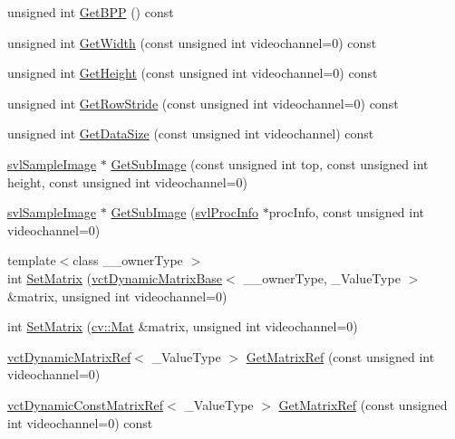 \begin{DoxyCompactItemize}
\item 
unsigned int \hyperlink{classsvl_sample_image_custom_a86dacd22703fbe2f2ac527995c90b704}{Get\+B\+P\+P} () const 
\item 
unsigned int \hyperlink{classsvl_sample_image_custom_af03ade3f099c87b685ad52c0183deac8}{Get\+Width} (const unsigned int videochannel=0) const 
\item 
unsigned int \hyperlink{classsvl_sample_image_custom_aa65d95dad39f90d1f84a9dd978120d95}{Get\+Height} (const unsigned int videochannel=0) const 
\item 
unsigned int \hyperlink{classsvl_sample_image_custom_a82aa2aea1a4d809685cf3c50d7eaaed3}{Get\+Row\+Stride} (const unsigned int videochannel=0) const 
\item 
unsigned int \hyperlink{classsvl_sample_image_custom_a09cde03b41e68144c2d11ce705914fcb}{Get\+Data\+Size} (const unsigned int videochannel) const 
\item 
\hyperlink{classsvl_sample_image}{svl\+Sample\+Image} $\ast$ \hyperlink{classsvl_sample_image_custom_a557f36a16a924eb9fcdd7231a61fb63e}{Get\+Sub\+Image} (const unsigned int top, const unsigned int height, const unsigned int videochannel=0)
\item 
\hyperlink{classsvl_sample_image}{svl\+Sample\+Image} $\ast$ \hyperlink{classsvl_sample_image_custom_af1641340334bb3ab547f17beb3f04383}{Get\+Sub\+Image} (\hyperlink{structsvl_proc_info}{svl\+Proc\+Info} $\ast$proc\+Info, const unsigned int videochannel=0)
\item 
{\footnotesize template$<$class \+\_\+\+\_\+owner\+Type $>$ }\\int \hyperlink{classsvl_sample_image_custom_aea63e2d0635a36a2123e4680d9ff78b2}{Set\+Matrix} (\hyperlink{classvct_dynamic_matrix_base}{vct\+Dynamic\+Matrix\+Base}$<$ \+\_\+\+\_\+owner\+Type, \+\_\+\+Value\+Type $>$ \&matrix, unsigned int videochannel=0)
\item 
int \hyperlink{classsvl_sample_image_custom_aae088ff614ece50824810c7a945e8264}{Set\+Matrix} (\hyperlink{namespacecv_a60d81b54f4914bec4cc4a72ab77eb444}{cv\+::\+Mat} \&matrix, unsigned int videochannel=0)
\item 
\hyperlink{classvct_dynamic_matrix_ref}{vct\+Dynamic\+Matrix\+Ref}$<$ \+\_\+\+Value\+Type $>$ \hyperlink{classsvl_sample_image_custom_ab48c98ffb5e68bcdbeb67b18f203dc64}{Get\+Matrix\+Ref} (const unsigned int videochannel=0)
\item 
\hyperlink{classvct_dynamic_const_matrix_ref}{vct\+Dynamic\+Const\+Matrix\+Ref}$<$ \+\_\+\+Value\+Type $>$ \hyperlink{classsvl_sample_image_custom_a559be73b24375b8b76cf9a593f2d1deb}{Get\+Matrix\+Ref} (const unsigned int videochannel=0) const 

\end{DoxyCompactItemize}
